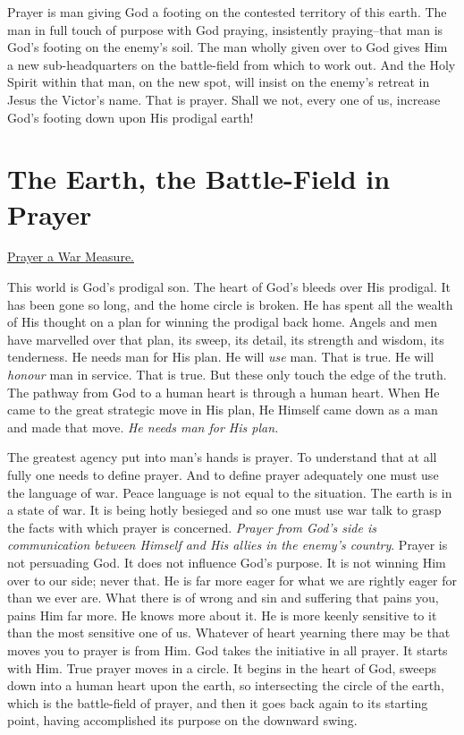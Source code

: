 Prayer is man giving God a footing on the contested territory of this
earth. The man in full touch of purpose with God praying, insistently
praying--that man is God's footing on the enemy's soil. The man wholly
given over to God gives Him a new sub-headquarters on the battle-field
from which to work out. And the Holy Spirit within that man, on the new
spot, will insist on the enemy's retreat in Jesus the Victor's name. That
is prayer. Shall we not, every one of us, increase God's footing down upon
His prodigal earth!




\chapter{The Earth, the Battle-Field in Prayer}



\underline{Prayer a War Measure.}


This world is God's prodigal son. The heart of God's bleeds over His
prodigal. It has been gone so long, and the home circle is broken. He has
spent all the wealth of His thought on a plan for winning the prodigal
back home. Angels and men have marvelled over that plan, its sweep, its
detail, its strength and wisdom, its tenderness. He needs man for His
plan. He will \textit{use} man. That is true. He will \textit{honour} man in service.
That is true. But these only touch the edge of the truth. The pathway from
God to a human heart is through a human heart. When He came to the great
strategic move in His plan, He Himself came down as a man and made that
move. \textit{He needs man for His plan.}

The greatest agency put into man's hands is prayer. To understand that at
all fully one needs to define prayer. And to define prayer adequately one
must use the language of war. Peace language is not equal to the
situation. The earth is in a state of war. It is being hotly besieged and
so one must use war talk to grasp the facts with which prayer is
concerned. \textit{Prayer from God's side is communication between Himself and
His allies in the enemy's country}. Prayer is not persuading God. It does
not influence God's purpose. It is not winning Him over to our side; never
that. He is far more eager for what we are rightly eager for than we ever
are. What there is of wrong and sin and suffering that pains you, pains
Him far more. He knows more about it. He is more keenly sensitive to it
than the most sensitive one of us. Whatever of heart yearning there may be
that moves you to prayer is from Him. God takes the initiative in all
prayer. It starts with Him. True prayer moves in a circle. It begins in
the heart of God, sweeps down into a human heart upon the earth, so
intersecting the circle of the earth, which is the battle-field of prayer,
and then it goes back again to its starting point, having accomplished its
purpose on the downward swing.



